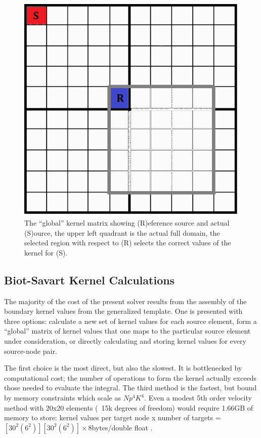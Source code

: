 \documentclass[letterpaper,12pt]{report}
\begin{document}
\begin{figure}
\centering
\includegraphics[width=5.5in]{GlobalKernel.PNG}
\caption{\label{fig:GlobalKernel}The ``global'' kernel matrix showing (R)eference source and actual (S)ource, the upper left quadrant is the actual full domain, the selected region with respect to (R) selects the correct values of the kernel for (S).}
\end{figure}

\subsection{Biot-Savart Kernel Calculations}
The majority of the cost of the present solver results from the assembly of the boundary kernel values from the generalized template. One is presented with three options: calculate a new set of kernel values for each source element, form a ``global'' matrix of kernel values that one maps to the particular source element under consideration, or directly calculating and storing kernel values for every source-node pair.

The first choice is the most direct, but also the slowest. It is bottlenecked by computational cost; the number of operations to form the kernel actually exceeds those needed to evaluate the integral. The third method is the fastest, but bound by memory constraints which scale as $Np^4 K^4$. Even a modest 5th order velocity method with 20x20 elements (~15k degrees of freedom) would require 1.66GB of memory to store: kernel values per target node x number of targets = $[30^2(6^2)][30^2(6^2)]\times$8bytes/double float .
\end{document}
